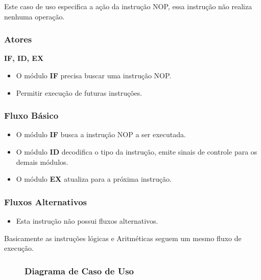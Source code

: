 
Este caso de uso especifica a ação da instrução NOP, essa instrução não realiza nenhuma operação.
 
\subsubsection*{Atores}
\textbf{IF, ID, EX}

\preconditions 
\begin{itemize}
 \item O módulo \textbf{IF} precisa buscar uma instrução NOP.
\end{itemize}

\postconditions
\begin{itemize}	
  \item Permitir execução de futuras instruções.
\end{itemize}

\subsubsection*{Fluxo Básico}
\begin{itemize}
\item O módulo \textbf{IF} busca a instrução NOP a ser executada.
\item O módulo \textbf{ID} decodifica o tipo da instrução, emite sinais de controle para os demais módulos.
\item O módulo \textbf{EX} atualiza para a próxima instrução.
\end{itemize}

\subsubsection*{Fluxos Alternativos}
\begin{itemize}
\item Esta instrução não possui fluxos alternativos.
\end{itemize}

Basicamente as instruções lógicas e Aritméticas seguem um mesmo fluxo de execução.
\begin{figure}[htpb!]
	\subsubsection*{Diagrama de Caso de Uso}
		
\end{figure}
